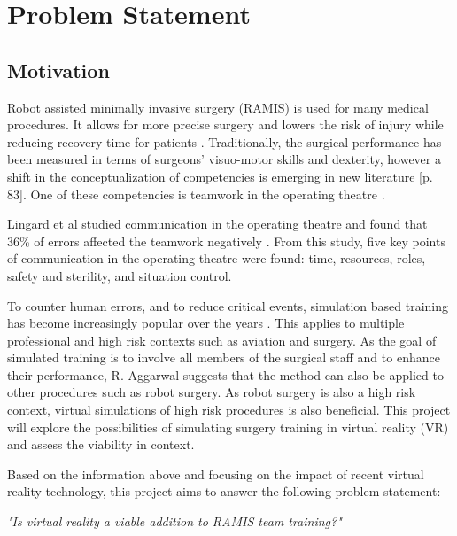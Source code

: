 \chapter{Problem Statement}

\section*{Motivation}

Robot assisted minimally invasive surgery (RAMIS) is used for many medical procedures. It allows for more precise surgery and lowers the risk of injury while reducing recovery time for patients \citep{radojcic_[history_2009}. Traditionally, the surgical performance has been measured in terms of surgeons' visuo-motor skills and dexterity, however a shift in the conceptualization of competencies is emerging in new literature \citep{flin_safer_2009}[p. 83]. One of these competencies is teamwork in the operating theatre \citep{salas_does_2008}. 

Lingard et al studied communication in the operating theatre and found that 36\% of errors affected the teamwork negatively \citep{lingard_communication_2004}. From this study, five key points of communication in the operating theatre were found: time, resources, roles, safety and sterility, and situation control.

To counter human errors, and to reduce critical events, simulation based training has become increasingly popular over the years \citep{aggarwal_simulated_2004}. This applies to multiple professional and high risk contexts such as aviation and surgery. As the goal of simulated training is to involve all members of the surgical staff and to enhance their performance, R. Aggarwal suggests that the method can also be applied to other procedures such as robot surgery. As robot surgery is also a high risk context, virtual simulations of high risk procedures is also beneficial. 
This project will explore the possibilities of simulating surgery training in virtual reality (VR) and assess the viability in context. 



Based on the information above and focusing on the impact of recent virtual reality technology, this project aims to answer the following problem statement:\\

\begin{center}
\emph{\textit{"Is virtual reality a viable addition to RAMIS team training?"}}
\end{center}


